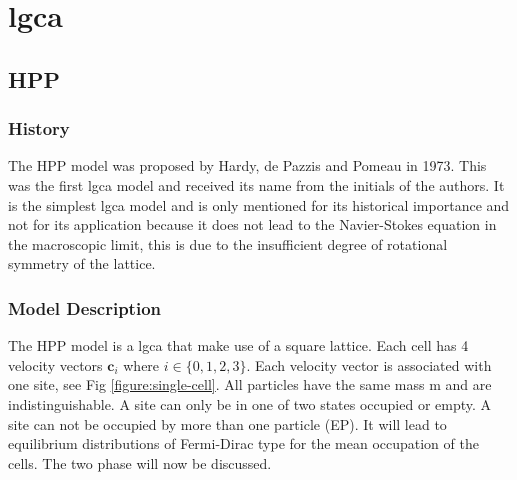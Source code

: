 \documentclass[a4paper,10pt]{article}
\begin{document}
\section{\acrfull{lgca}}
\subsection{HPP}
\subsubsection{History}
The HPP model was proposed by Hardy, de Pazzis and Pomeau in 1973.
This was the first \acrshort{lgca} model and received its name from the initials of the authors. It is the simplest \acrshort{lgca} model and is only mentioned for its historical importance and not for its application because it does not lead to the Navier-Stokes equation in the macroscopic limit, this is due to the insufficient degree of rotational symmetry of the lattice. 
\subsubsection{Model Description}
The HPP model is a \acrshort{lgca} that make use of a square lattice.
Each cell has 4 velocity vectors $\textbf{c}_{i}$ where $i \in \{0, 1, 2, 3\}$. Each velocity vector is associated with one site, see Fig \ref{figure:single-cell}. All particles have the same mass m and are indistinguishable. A site can only be in one of two states occupied or empty. A site can not be occupied by more than one particle (\Gls{EP}). It will lead to equilibrium distributions of Fermi-Dirac type for
the mean occupation of the cells.%
The two phase will now be discussed.
\end{document}
